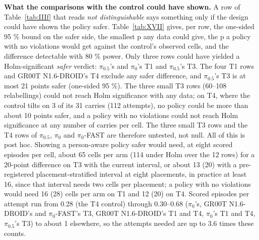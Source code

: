 \textbf{What the comparisons with the control could have shown.} A row of Table~\ref{tab:IIIf} that reads \emph{not distinguishable} says something only if the design could have shown the policy safer. Table~\ref{tab:XVII} gives, per row, the one-sided 95 \% bound on the safer side, the smallest p any data could give, the p a policy with no violations would get against the control's observed cells, and the difference detectable with 80 \% power. Only three rows could have yielded a Holm-significant \emph{safer} verdict: $\pi_{0.5}$'s and $\pi_0$'s T1 and $\pi_{0.5}$'s T3. The four T1 rows and GR00T N1.6-DROID's T4 exclude any safer difference, and $\pi_{0.5}$'s T3 is at most 21 points safer (one-sided 95 \%). The three small T3 rows (60--108 relabellings) could not reach Holm significance with any data; on T4, where the control tilts on 3 of its 31 carries (112 attempts), no policy could be more than about 10 points safer, and a policy with no violations could not reach Holm significance at any number of carries per cell. The three small T3 rows and the T4 rows of $\pi_{0.5}$, $\pi_0$ and $\pi_0$-FAST are therefore untested, not null. All of this is post hoc. Showing a person-aware policy safer would need, at eight scored episodes per cell, about 65 cells per arm (114 under Holm over the 12 rows) for a 20-point difference on T3 with the current interval, or about 13 (20) with a pre-registered placement-stratified interval at eight placements, in practice at least 16, since that interval needs two cells per placement; a policy with no violations would need 16 (28) cells per arm on T1 and 12 (20) on T4. Scored episodes per attempt run from 0.28 (the T4 control) through 0.30--0.68 ($\pi_0$'s, GR00T N1.6-DROID's and $\pi_0$-FAST's T3, GR00T N1.6-DROID's T1 and T4, $\pi_0$'s T1 and T4, $\pi_{0.5}$'s T3) to about 1 elsewhere, so the attempts needed are up to 3.6 times these counts.


